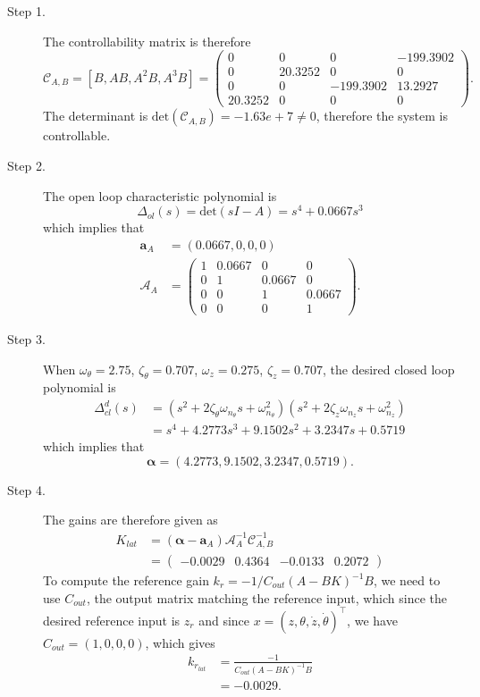 \begin{description}
\item[Step 1.] 
The controllability matrix is therefore
\[
\mathcal{C}_{A,B} = [B, AB, A^2B, A^3B] = \begin{pmatrix}           
         0 &        0 &        0 &-199.3902 \\
         0 &  20.3252 &        0 &        0 \\
         0 &        0 &-199.3902 &  13.2927 \\
   20.3252 &        0 &        0 &        0 \end{pmatrix}.
\]
The determinant is $\text{det}(\mathcal{C}_{A,B})=-1.63e+7\neq 0$, therefore the system is controllable.  
\item[Step 2.] The open loop characteristic polynomial is
\[
\Delta_{ol}(s)=\text{det}(sI-A) = s^4  + 0.0667s^3
\]
which implies that
\begin{align*}
\mathbf{a}_A &= (0.0667, 0, 0, 0) \\
\mathcal{A}_A &= \begin{pmatrix}           
         1 &  0.0667 &        0 & 0 \\
         0 &       1 &   0.0667 & 0 \\
         0 &       0 &        1 &  0.0667 \\
         0 &       0 &        0 & 1 \end{pmatrix}.
\end{align*}

\item[Step 3.] When $\omega_\theta = 2.75$, $\zeta_\theta = 0.707$, $\omega_z=0.275$, $\zeta_z=0.707$, the desired closed loop polynomial is
\begin{align*}
\Delta_{cl}^d(s) &= (s^2+2\zeta_{\theta}\omega_{n_\theta} s + \omega_{n_\theta}^2)(s^2+2\zeta_{z}\omega_{n_z} s + \omega_{n_z}^2) \\
&=s^4 + 4.2773 s^3 + 9.1502 s^2 + 3.2347 s + 0.5719       
\end{align*}
which implies that
\[
\boldsymbol{\alpha} = (4.2773,  9.1502,  3.2347,  0.5719).
\]

\item[Step 4.]
The gains are therefore given as
\begin{align*}
K_{lat} &= (\boldsymbol{\alpha}-\mathbf{a}_A)\mathcal{A}_A^{-1}\mathcal{C}_{A,B}^{-1} \\
  &= \begin{pmatrix} -0.0029 &   0.4364 &  -0.0133 &   0.2072 \end{pmatrix}
\end{align*}
To compute the reference gain $k_r=-1/C_{out}(A-BK)^{-1}B$, we need to use $C_{out}$, the output matrix matching the reference input, which since the desired reference input is $z_r$ and since $x=(z, \theta,\dot{z},\dot{\theta})^{\top}$, we have $C_{out}=(1,0,0,0)$, which gives
\begin{align*}
k_{r_{lat}} &= \frac{-1}{C_{out}(A-BK)^{-1}B} \\
    &= -0.0029.
\end{align*}
\end{description}

